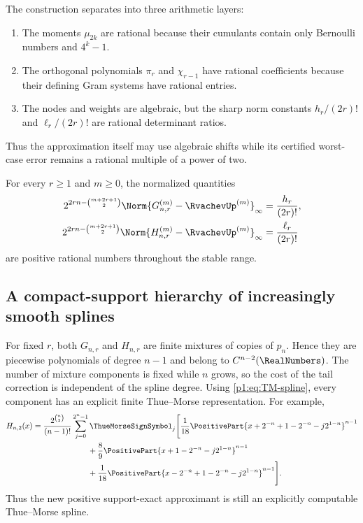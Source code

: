 \documentclass[11pt]{article}
\numberwithin{equation}{section}
\theoremstyle{definition}
\theoremstyle{remark}
\begin{document}
The construction separates into three arithmetic layers:
\begin{enumerate}
\item The moments $\mu_{2k}$ are rational because their cumulants contain only Bernoulli numbers and $4^k-1$.
\item The orthogonal polynomials $\pi_r$ and $\chi_{r-1}$ have rational coefficients because their defining Gram systems have rational entries.
\item The nodes and weights are algebraic, but the sharp norm constants $h_r/(2r)!$ and $\ell_r/(2r)!$ are rational determinant ratios.
\end{enumerate}
Thus the approximation itself may use algebraic shifts while its certified worst-case error remains a rational multiple of a power of two.

\begin{corollary}
For every $r\ge1$ and $m\ge0$, the normalized quantities
\begin{align}
 2^{2rn-\binom{m+2r+1}{2}}
 \Norm{G_{n,r}^{(m)}-\RvachevUp^{(m)}}_\infty
 &=\frac{h_r}{(2r)!},\label{p1:eq:rational-G-normalized}\\
 2^{2rn-\binom{m+2r+1}{2}}
 \Norm{H_{n,r}^{(m)}-\RvachevUp^{(m)}}_\infty
 &=\frac{\ell_r}{(2r)!}
 \label{p1:eq:rational-L-normalized}
\end{align}
are positive rational numbers throughout the stable range.
\end{corollary}

\subsection{A compact-support hierarchy of increasingly smooth splines}

For fixed $r$, both $G_{n,r}$ and $H_{n,r}$ are finite mixtures of copies of $p_n$.  Hence they are piecewise polynomials of degree $n-1$ and belong to $C^{n-2}(\RealNumbers)$.  The number of mixture components is fixed while $n$ grows, so the cost of the tail correction is independent of the spline degree.  Using \eqref{p1:eq:TM-spline}, every component has an explicit finite Thue--Morse representation.  For example,
\begin{align}
 H_{n,2}(x)
 &=\frac{2^{\binom n2}}{(n-1)!}
 \sum_{j=0}^{2^n-1}\ThueMorseSignSymbol_j
 \Bigg[
 \frac1{18}\PositivePart{x+2^{-n}+1-2^{-n}-j2^{1-n}}^{n-1}\nonumber\\
 &\hspace{7em}+\frac89\PositivePart{x+1-2^{-n}-j2^{1-n}}^{n-1}\nonumber\\
 &\hspace{7em}+\frac1{18}\PositivePart{x-2^{-n}+1-2^{-n}-j2^{1-n}}^{n-1}
 \Bigg].
 \label{p1:eq:Hn2-TM}
\end{align}
Thus the new positive support-exact approximant is still an explicitly computable Thue--Morse spline.
\end{document}
